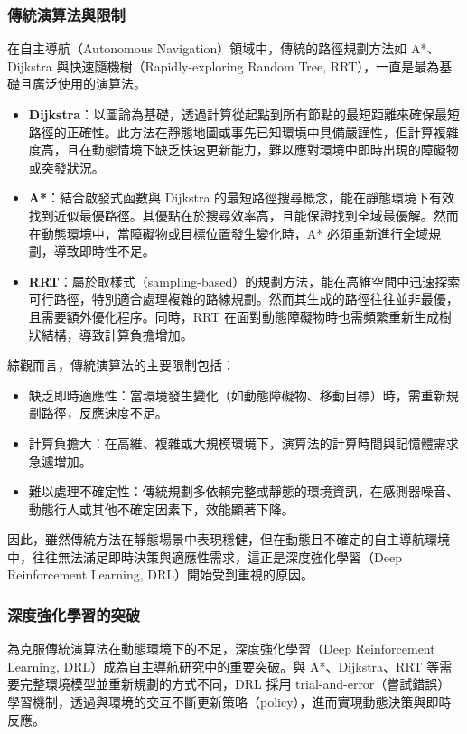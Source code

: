 \documentclass[12pt,a4paper]{article}
\begin{document}
\subsubsection{傳統演算法與限制}
在自主導航（Autonomous Navigation）領域中，傳統的路徑規劃方法如 A*、Dijkstra 與快速隨機樹（Rapidly-exploring Random Tree, RRT），一直是最為基礎且廣泛使用的演算法。

\begin{itemize}
  \item \textbf{Dijkstra}：以圖論為基礎，透過計算從起點到所有節點的最短距離來確保最短路徑的正確性。此方法在靜態地圖或事先已知環境中具備嚴謹性，但計算複雜度高，且在動態情境下缺乏快速更新能力，難以應對環境中即時出現的障礙物或突發狀況。
  \item \textbf{A*}：結合啟發式函數與 Dijkstra 的最短路徑搜尋概念，能在靜態環境下有效找到近似最優路徑。其優點在於搜尋效率高，且能保證找到全域最優解。然而在動態環境中，當障礙物或目標位置發生變化時，A* 必須重新進行全域規劃，導致即時性不足。
  \item \textbf{RRT}：屬於取樣式（sampling-based）的規劃方法，能在高維空間中迅速探索可行路徑，特別適合處理複雜的路線規劃。然而其生成的路徑往往並非最優，且需要額外優化程序。同時，RRT 在面對動態障礙物時也需頻繁重新生成樹狀結構，導致計算負擔增加。
\end{itemize}

\noindent 綜觀而言，傳統演算法的主要限制包括：
\begin{itemize}
  \item 缺乏即時適應性：當環境發生變化（如動態障礙物、移動目標）時，需重新規劃路徑，反應速度不足。
  \item 計算負擔大：在高維、複雜或大規模環境下，演算法的計算時間與記憶體需求急遽增加。
  \item 難以處理不確定性：傳統規劃多依賴完整或靜態的環境資訊，在感測器噪音、動態行人或其他不確定因素下，效能顯著下降。
\end{itemize}

因此，雖然傳統方法在靜態場景中表現穩健，但在動態且不確定的自主導航環境中，往往無法滿足即時決策與適應性需求，這正是深度強化學習（Deep Reinforcement Learning, DRL）開始受到重視的原因。


\subsubsection{深度強化學習的突破}
為克服傳統演算法在動態環境下的不足，深度強化學習（Deep Reinforcement Learning, DRL）成為自主導航研究中的重要突破。與 A*、Dijkstra、RRT 等需要完整環境模型並重新規劃的方式不同，DRL 採用 trial-and-error（嘗試錯誤）學習機制，透過與環境的交互不斷更新策略（policy），進而實現動態決策與即時反應。
\end{document}
